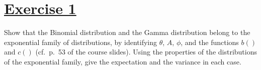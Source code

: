 \documentclass[a4paper,12pt]{article}
\begin{document}

\begin{center}
\bigskip

\bigskip

\bigskip

\bigskip

\bigskip

\bigskip


\bigskip

\bigskip

\bigskip
\end{center}



\setlength{\parskip}{1ex plus 0.5ex minus 0.2ex}
\parindent=0cm
\setlength{\parskip}{1ex plus 0.5ex minus 0.2ex}
\linespread{1.1}
\sloppy

\section{\underline{Exercise 1}}
Show that the Binomial distribution and the Gamma distribution belong to the exponential family of distributions, by identifying $\theta$, $A$, $\phi$, and the functions $b()$ and $c()$ (cf.\ p.~53 of the course slides). Using the properties of the distributions of the exponential family, give the expectation and the variance in each case.
\end{document}
